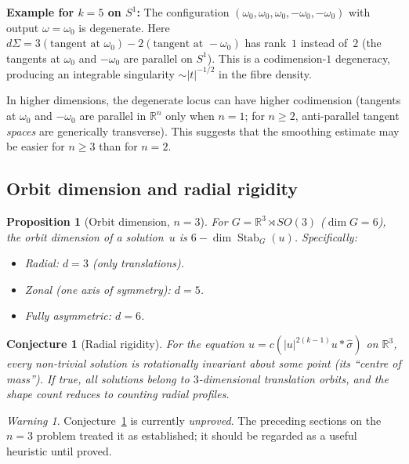 \documentclass[12pt]{article}
\newtheorem{proposition}[theorem]{Proposition}
\newtheorem{conjecture}[theorem]{Conjecture}
\theoremstyle{definition}
\theoremstyle{remark}
\newtheorem{warning}[theorem]{Warning}
\DeclareMathOperator{\Stab}{Stab}
\newcommand{\R}{\mathbb{R}}
\newcommand{\wh}{\widehat}
\begin{document}
\textbf{Example for $k=5$ on $S^1$:}  The configuration
$(\omega_0,\omega_0,\omega_0,-\omega_0,-\omega_0)$ with output
$\omega=\omega_0$ is degenerate.  Here
$d\Sigma=3(\text{tangent at }\omega_0)-2(\text{tangent at }-\omega_0)$
has rank~$1$ instead of~$2$ (the tangents at $\omega_0$ and $-\omega_0$
are parallel on $S^1$).  This is a codimension-$1$ degeneracy, producing
an integrable singularity $\sim|t|^{-1/2}$ in the fibre density.

In higher dimensions, the degenerate locus can have higher codimension
(tangents at $\omega_0$ and $-\omega_0$ are parallel in $\R^n$ only
when $n=1$; for $n\geq 2$, anti-parallel tangent \emph{spaces} are
generically transverse).  This suggests that the smoothing estimate may
be easier for $n\geq 3$ than for $n=2$.

\subsection{Orbit dimension and radial rigidity}

\begin{proposition}[Orbit dimension, $n=3$]
  For $G=\R^3\rtimes SO(3)$ ($\dim G=6$), the orbit dimension of a
  solution~$u$ is $6-\dim\Stab_G(u)$.  Specifically:
  \begin{itemize}
    \item Radial: $d=3$ (only translations).
    \item Zonal (one axis of symmetry): $d=5$.
    \item Fully asymmetric: $d=6$.
  \end{itemize}
\end{proposition}

\begin{conjecture}[Radial rigidity]
  \label{conj:radial}
  For the equation $u=c(|u|^{2(k-1)}u\ast\wh\sigma)$ on $\R^3$, every
  non-trivial solution is rotationally invariant about some point (its
  ``centre of mass'').  If true, all solutions belong to $3$-dimensional
  translation orbits, and the shape count reduces to counting radial profiles.
\end{conjecture}

\begin{warning}
  Conjecture~\ref{conj:radial} is currently \emph{unproved}.  The
  preceding sections on the $n=3$ problem treated it as established; it
  should be regarded as a useful heuristic until proved.
\end{warning}

\end{document}
